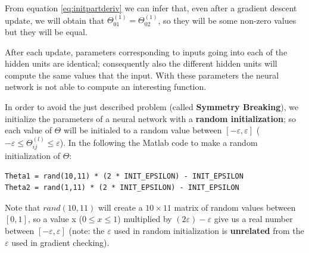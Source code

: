 From equation \ref{eq:initpartderiv} we can infer that, even after a gradient descent update, we will obtain that $\Theta_{01}^{(1)} = \Theta_{02}^{(1)}$, so they will be some non-zero values but they will be equal.

After each update, parameters corresponding to inputs going into each of the hidden units are identical; consequently also the different hidden units will compute the same values that the input. With these parameters the neural network is not able to compute an interesting function.

In order to avoid the just described problem (called {\bf Symmetry Breaking}), we initialize the parameters of a neural network with a {\bf random initialization}; so each value of $\Theta$ will be initialed to a random value between $[-\varepsilon, \varepsilon]$ ($-\varepsilon \le \Theta_{ij}^{(l)} \le \varepsilon$). In the following the Matlab code to make a random initialization of $\Theta$:

\begin{mdframed}[style=MyFrame]
\begin{lstlisting}
Theta1 = rand(10,11) * (2 * INIT_EPSILON) - INIT_EPSILON
Theta2 = rand(1,11) * (2 * INIT_EPSILON) - INIT_EPSILON
\end{lstlisting}
\end{mdframed}
Note that {\it $rand(10,11)$} will create a $10 \times 11$ matrix of random values between $[0,1]$, so a value x ($0 \le x \le 1$) multiplied by $(2\varepsilon)-\varepsilon$ give us a real number between $[-\varepsilon ,\varepsilon ]$ (note: the $\varepsilon$ used in random initialization is {\bf unrelated}  from the $\varepsilon$ used in gradient checking).




